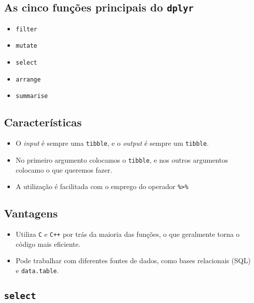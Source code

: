 \documentclass[]{book}
\providecommand{\tightlist}{%
  \setlength{\itemsep}{0pt}\setlength{\parskip}{0pt}}
\begin{document}
\subsection{\texorpdfstring{As cinco funções principais do
\texttt{dplyr}}{As cinco funções principais do dplyr}}\label{as-cinco-funcoes-principais-do-dplyr}

\begin{itemize}
\tightlist
\item
  \texttt{filter}
\item
  \texttt{mutate}
\item
  \texttt{select}
\item
  \texttt{arrange}
\item
  \texttt{summarise}
\end{itemize}

\subsection{Características}\label{caracteristicas}

\begin{itemize}
\tightlist
\item
  O \emph{input} é sempre uma \texttt{tibble}, e o \emph{output} é
  sempre um \texttt{tibble}.
\item
  No primeiro argumento colocamos o \texttt{tibble}, e nos outros
  argumentos colocamo o que queremos fazer.
\item
  A utilização é facilitada com o emprego do operador
  \texttt{\%\textgreater{}\%}
\end{itemize}

\subsection{Vantagens}\label{vantagens}

\begin{itemize}
\tightlist
\item
  Utiliza \texttt{C} e \texttt{C++} por trás da maioria das funções, o
  que geralmente torna o código mais eficiente.
\item
  Pode trabalhar com diferentes fontes de dados, como bases relacionais
  (SQL) e \texttt{data.table}.
\end{itemize}

\subsection{\texorpdfstring{\texttt{select}}{select}}\label{select}
\end{document}
